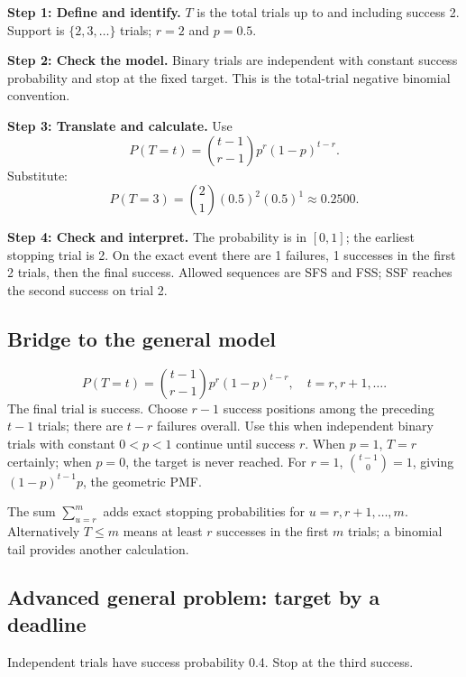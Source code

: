 \par\noindent\begin{minipage}{\linewidth}
\textbf{Step 1: Define and identify.} $T$ is the total trials up to and including success 2. Support is $\{2,3,\ldots\}$ trials; $r=2$ and $p=0.5$.
\end{minipage}\par\medskip
\par\noindent\begin{minipage}{\linewidth}
\textbf{Step 2: Check the model.} Binary trials are independent with constant success probability and stop at the fixed target. This is the total-trial negative binomial convention.
\end{minipage}\par\medskip
\par\noindent\begin{minipage}{\linewidth}
\textbf{Step 3: Translate and calculate.} Use
\[P(T=t)=\binom{t-1}{r-1}p^r(1-p)^{t-r}.\]
Substitute:
\[P(T=3)=\binom{2}{1}(0.5)^2(0.5)^{1}\approx 0.2500.\]
\end{minipage}\par\medskip
\par\noindent\begin{minipage}{\linewidth}
\textbf{Step 4: Check and interpret.} The probability is in $[0,1]$; the earliest stopping trial is 2. On the exact event there are 1 failures, 1 successes in the first 2 trials, then the final success. Allowed sequences are SFS and FSS; SSF reaches the second success on trial 2.
\end{minipage}\par\medskip
\subsection{Bridge to the general model}
\[P(T=t)=\binom{t-1}{r-1}p^r(1-p)^{t-r},\quad t=r,r+1,\ldots.\]
The final trial is success. Choose $r-1$ success positions among the preceding $t-1$ trials; there are $t-r$ failures overall. Use this when independent binary trials with constant $0<p<1$ continue until success $r$. When $p=1$, $T=r$ certainly; when $p=0$, the target is never reached. For $r=1$, $\binom{t-1}{0}=1$, giving $(1-p)^{t-1}p$, the geometric PMF.

The sum $\sum_{u=r}^{m}$ adds exact stopping probabilities for $u=r,r+1,\ldots,m$. Alternatively $T\leq m$ means at least $r$ successes in the first $m$ trials; a binomial tail provides another calculation.
\subsection{Advanced general problem: target by a deadline}
Independent trials have success probability 0.4. Stop at the third success.

